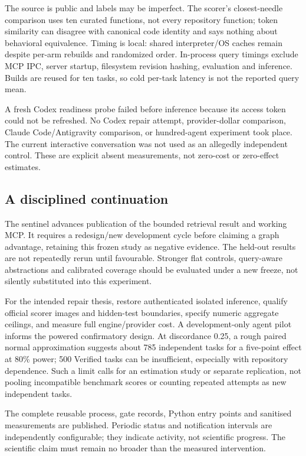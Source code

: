 \documentclass[11pt]{article}
\begin{document}
The source is public and labels may be imperfect. The scorer's closest-needle comparison uses ten curated functions, not every repository function; token similarity can disagree with canonical code identity and says nothing about behavioral equivalence. Timing is local: shared interpreter/OS caches remain despite per-arm rebuilds and randomized order. In-process query timings exclude MCP IPC, server startup, filesystem revision hashing, evaluation and inference. Builds are reused for ten tasks, so cold per-task latency is not the reported query mean.

A fresh Codex readiness probe failed before inference because its access token could not be refreshed. No Codex repair attempt, provider-dollar comparison, Claude Code/Antigravity comparison, or hundred-agent experiment took place. The current interactive conversation was not used as an allegedly independent control. These are explicit absent measurements, not zero-cost or zero-effect estimates.

\subsection{A disciplined continuation}
The sentinel advances publication of the bounded retrieval result and working MCP. It requires a redesign/new development cycle before claiming a graph advantage, retaining this frozen study as negative evidence. The held-out results are not repeatedly rerun until favourable. Stronger flat controls, query-aware abstractions and calibrated coverage should be evaluated under a new freeze, not silently substituted into this experiment.

For the intended repair thesis, restore authenticated isolated inference, qualify official scorer images and hidden-test boundaries, specify numeric aggregate ceilings, and measure full engine/provider cost. A development-only agent pilot informs the powered confirmatory design. At discordance 0.25, a rough paired normal approximation suggests about 785 independent tasks for a five-point effect at 80\% power; 500 Verified tasks can be insufficient, especially with repository dependence. Such a limit calls for an estimation study or separate replication, not pooling incompatible benchmark scores or counting repeated attempts as new independent tasks.

The complete reusable process, gate records, Python entry points and sanitised measurements are published. Periodic status and notification intervals are independently configurable; they indicate activity, not scientific progress. The scientific claim must remain no broader than the measured intervention.
\end{document}
